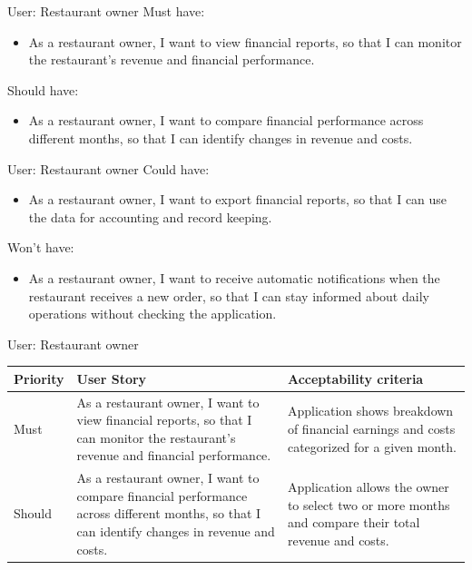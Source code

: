 \documentclass{beamer}
\begin{document}
\begin{frame}{User: Restaurant owner}
Must have:
\begin{itemize}
\item As a restaurant owner, I want to view financial reports, so that I can monitor the restaurant's revenue and financial performance.
\end{itemize}
Should have:
\begin{itemize}
\item As a restaurant owner, I want to compare financial performance across different months, so that I can identify changes in revenue and costs.
\end{itemize}
\end{frame}

\begin{frame}{User: Restaurant owner}
Could have:
\begin{itemize}
\item As a restaurant owner, I want to export financial reports, so that I can use the data for accounting and record keeping.
\end{itemize}
Won't have:
\begin{itemize}
\item As a restaurant owner, I want to receive automatic notifications when the restaurant receives a new order, so that I can stay informed about daily operations without checking the application.
\end{itemize}
\end{frame}

\begin{frame}{User: Restaurant owner}
\begin{tabular}{| l | p{4cm} | p{4cm} |}
\hline
Priority & User Story & Acceptability criteria \\
\hline
Must & As a restaurant owner, I want to view financial reports, so that I can monitor the restaurant's revenue and financial performance.
     & Application shows breakdown of financial earnings and costs categorized for a given month. \\
\hline
Should & As a restaurant owner, I want to compare financial performance across different months, so that I can identify changes in revenue and costs.
       & Application allows the owner to select two or more months and compare their total revenue and costs. \\
\hline
\end{tabular}
\end{frame}
\end{document}
